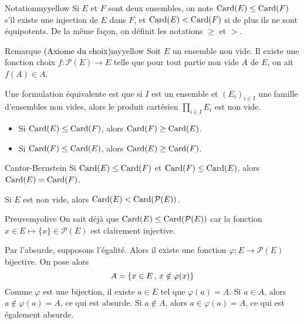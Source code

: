     \begin{omed}{Notation}{myyellow}
        Si $E$ et $F$ sont deux ensembles, on note $\operatorname{Card}(E) \leq \operatorname{Card}(F)$ s’il existe une injection de $E$ dans $F$, et $\operatorname{Card}(E) < \operatorname{Card}(F)$ si de plus ils ne sont équipotents. De la même façon, on définit les notations $\geq$ et $>$.
    \end{omed}

    \begin{omed}{Remarque \textcolor{black}{(Axiome du choix)}}{myyellow}
        Soit $E$ un ensemble non vide. Il existe une fonction choix $f : \mathcal{P}(E) \to E$ telle que pour tout partie non vide $A$ de $E$, on ait $f(A) \in A$. 
        
        Une formulation équivalente est que si $I$ est un ensemble et $(E_i)_{i \in I}$ une famille d’ensembles non vides, alors le produit cartésien $\prod_{i \in I} E_i$ est non vide.
    \end{omed}

    \begin{prop}{}{}
        \begin{itemize}
            \item Si $\operatorname{Card}(E) \leq \operatorname{Card}(F)$, alors $\operatorname{Card}(F) \geq \operatorname{Card}(E)$.
            \item Si $\operatorname{Card}(F) \leq \operatorname{Card}(E)$, alors $\operatorname{Card}(E) \geq \operatorname{Card}(F)$.
        \end{itemize}
    \end{prop}

    \begin{theo}{Cantor-Bernstein}{}
        Si $\operatorname{Card}(E) \leq \operatorname{Card}(F)$ et $\operatorname{Card}(F) \leq \operatorname{Card}(E)$, alors $\operatorname{Card}(E) = \operatorname{Card}(F)$.
    \end{theo}

    \begin{prop}{}{}
        Si $E$ est non vide, alors $\operatorname{Card}(E) < \operatorname{Card}(\mathcal{P}(E))$.
    \end{prop}

    \begin{demo}{Preuve}{myolive}
        On sait déjà que $\operatorname{Card}(E) \leq \operatorname{Card}(\mathcal{P}(E))$ car la fonction $x \in E \mapsto \{x\} \in \mathcal{P}(E)$ est clairement injective. 

        Par l’absurde, supposons l’égalité. Alors il existe une fonction $\varphi : E \to \mathcal{P}(E)$ bijective. On pose alors 
        \[ A = \left\{ x \in E \, , \, x \notin \varphi(x) \right\} \]
        Comme $\varphi$ est une bijection, il existe $a \in E$ tel que $\varphi(a) = A$. Si $a \in A$, alors $a \notin \varphi(a) = A$, ce qui est absurde. Si $a \notin A$, alors $a \in \varphi(a) = A$, ce qui est également absurde. 
    \end{demo}

